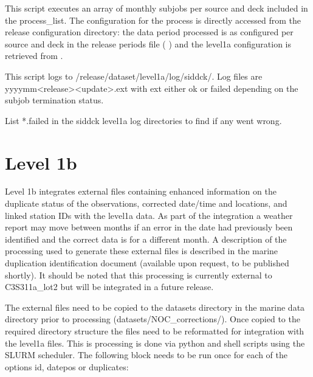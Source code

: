 \documentclass[letterpaper,10pt,english]{sphinxmanual}
\begin{document}
This script executes an array of monthly subjobs per source and deck included in
the process\_list. The configuration for the process is directly accessed from
the release configuration directory: the data period processed is as configured
per source and deck in the release periods file ( {\hyperref[\detokenize{index:release-periods-file}]{}})
and the level1a configuration is retrieved from {\hyperref[\detokenize{index:level1a-config-file}]{}}.

This script logs to /release/dataset/level1a/log/sid\sphinxhyphen{}dck/. Log files
are yyyy\sphinxhyphen{}mm\sphinxhyphen{}\textless{}release\textgreater{}\sphinxhyphen{}\textless{}update\textgreater{}.ext with ext either ok or failed depending on the
subjob termination status.

List  *.failed in the sid\sphinxhyphen{}dck level1a log directories to find if any went wrong.


\chapter{Level 1b}
\label{\detokenize{index:level-1b}}
Level 1b integrates external files containing enhanced information on the
duplicate status of the observations, corrected date/time and locations, and
linked station IDs with the level1a data. As part of the integration a weather
report may move between months if an error in the date had previously been
identified and the correct data is for a different month. A description of the
processing used to generate these external files is described in the marine
duplication identification document (available upon request,
to be published shortly). It should be noted that this processing is currently
external to C3S311a\_lot2 but will be integrated in a future release.

The external files need to be copied to the datasets directory in the marine
data directory prior to processing (datasets/NOC\_corrections/).
Once copied to the required directory structure the files need to be reformatted
for integration with the level1a files. This is processing is done via python
and shell scripts using the SLURM scheduler. The following block needs to be run
once for each of the options id, datepos or duplicates:
\end{document}
